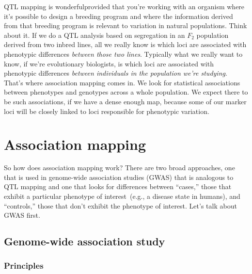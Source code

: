 \documentclass[12pt]{article}
\begin{document}
QTL mapping is wonderful{\dash}provided that you're working with an
organism where it's possible to design a breeding program and where
the information derived from that breeding program is relevant to
variation in natural populations. Think about it. If we do a QTL
analysis based on segregation in an $F_2$ population derived from two
inbred lines, all we really know is which loci are associated with
phenotypic differences {\it between those two lines}. Typically what
we really want to know, if we're evolutionary biologists, is which
loci are associated with phenotypic differences {\it between
  individuals in the population we're studying}. That's where
association mapping comes in. We look for statistical associations
between phenotypes and genotypes across a whole population. We expect
there to be such associations, if we have a dense enough map, because
some of our marker loci will be closely linked to loci responsible for
phenotypic variation.

\section*{Association mapping}

So how does association mapping work? There are two broad approaches,
one that is used in genome-wide association studies (GWAS) that is
analogous to QTL mapping and one that looks for differences between
``cases,'' those that exhibit a particular phenotype of
interest~(e.g., a disease state in humans), and ``controls,'' those
that don't exhibit the phenotype of interest. Let's talk about GWAS
first.

\subsection*{Genome-wide association study}

\subsubsection*{Principles}
\end{document}
